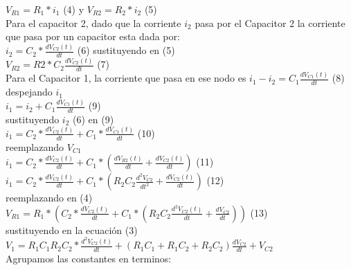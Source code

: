 \documentclass[
	12pt, %
]{fphw}
\begin{document}
$V_{R1} = R_{1} * i_{1}$ (4)  y $V_{R2} = R_{2} * i_{2}$ (5) \\

Para el capacitor 2, dado que la corriente $i_{2}$ pasa por el Capacitor 2 la corriente que pasa por un capacitor esta dada por:\\

$i_{2} = C_{2} * \frac{d V_{C2}(t)}{dt}$ (6) sustituyendo en (5) \\

$V_{R2} = R2 * C_{2} \frac{d V_{C2}(t)}{dt}$ (7) \\

Para el Capacitor 1, la corriente que pasa en ese nodo es $i_{1} - i_{2} = C_{1} \frac{d V_{C1}(t)}{dt}$ (8) \\

despejando $i_1$ \\

$i_{1} = i_{2} + C_{1} \frac{d V_{C1}(t)}{dt}$ (9) \\

sustituyendo $i_{2}$ (6) en (9) \\

$i_{1} = C_{2} * \frac{d V_{C2}(t)}{dt} + C_{1} * \frac{d V_{C1}(t)}{dt}$ (10) \\

reemplazando $V_{C1}$ \\

$i_{1} = C_{2} * \frac{d V_{C2}(t)}{dt} + C_{1} * \left( \frac{d V_{R2}(t)}{dt} + \frac{d V_{C2}(t)}{dt} \right)$ (11) \\

$i_{1} = C_{2} * \frac{d V_{C2}(t)}{dt} + C_{1} * \left( R_{2}C_{2} \frac{d^{2}V_{C2}}{dt^{2}} + \frac{d V_{C2}(t)}{dt} \right)$ (12)\\

reemplazando en (4) \\

$V_{R1} = R_{1} * \left( C_{2} * \frac{d V_{C2}(t)}{dt} + C_{1}* \left( R_{2}C_{2} \frac{d^{2}V_{C2}(t)}{dt}+\frac{dV_{C2}}{dt} \right) \right)$ (13) \\

sustituyendo en la ecuación (3) \\

$V_{1} = R_{1}C_{1}R_{2}C_{2}*\frac{d^{2}V_{C2}(t)}{dt} + \left( R_{1}C_{1}+R_{1}C_{2}+R_{2}C_{2}\right) \frac{dV_{C2}}{dt} + V_{C2}$ \\

Agrupamos las constantes en terminos: \\
\end{document}
